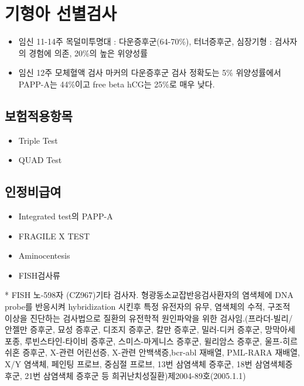 \section{기형아 선별검사}
{
\begin{itemize}\tightlist
\item 임신 11-14주 목덜미투명대 : 다운증후군(64-70\%), 터너증후군, 심장기형 : 검사자의 경험에 의존, 20\%의 높은 위양성률
\item 임신 12주 모체혈액 검사 마커의 다운증후군 검사 정확도는 5\% 위양성률에서 PAPP-A는 44\%이고 free beta hCG는 25\%로 매우 낮다.
\end{itemize}
}
\prezi{\clearpage}
\subsection{보험적용항목}
\begin{itemize}\tightlist
\item Triple Test
\item QUAD Test
\end{itemize}
\prezi{\clearpage}
\subsection{인정비급여}
\begin{itemize}\tightlist
\item Integrated test의 PAPP-A
\item FRAGILE X TEST
\item Aminocentesis
\item FISH검사류
\end{itemize}
* FISH
노-598자
(CZ967)기타 검사자.
형광동소교잡반응검사환자의 염색체에 DNA probe를 반응시켜 hybridization 시킨후 특정 유전자의 유무, 염색체의 수적, 구조적 이상을 진단하는 검사법으로 질환의 유전학적 원인파악을 위한 검사임.(프라더-빌리/안젤만 증후군, 묘성 증후군, 디조지 증후군, 칼만 증후군, 밀러-디커 증후군, 망막아세포종, 루빈스타인-타이비 증후군, 스미스-마게니스 증후군, 윌리암스 증후군, 울프-히르쉬혼 증후군, X-관련 어린선증, X-관련 안백색증,bcr-abl 재배열, PML-RARA 재배열, X/Y 염색체, 페인팅 프로브, 중심절 프로브, 13번 삼염색체 증후군, 18번 삼염색체증후군, 21번 삼염색체 증후군 등 희귀난치성질환)제2004-89호(2005.1.1)
\prezi{\clearpage}
